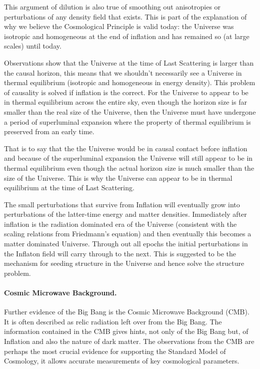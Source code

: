 This argument of dilution is also true of smoothing out anisotropies or perturbations of any density field that exists. This is part of the explanation of why we believe the Cosmological Principle is valid today: the Universe was isotropic and homogeneous at the end of inflation and has remained so (at large scales) until today.

Observations show that the Universe at the time of Last Scattering is larger than the causal horizon, this means that we shouldn't necessarily see a Universe in thermal equilibrium (isotropic and homogeneous in energy density). This problem of causality is solved if inflation is the correct. For the Universe to appear to be in thermal equilibrium across the entire sky, even though the horizon size is far smaller than the real size of the Universe, then the Universe must have undergone a period of superluminal expansion where the property of thermal equilibrium is preserved from an early time.

That is to say that the the Universe would be in causal contact before inflation and because of the superluminal expansion the Universe will still appear to be in thermal equilibrium even though the actual horizon size is much smaller than the size of the Universe. This is why the Universe can appear to be in thermal equilibrium at the time of Last Scattering.

The small perturbations that survive from Inflation will eventually grow into perturbations of the latter-time energy and matter densities. Immediately after inflation is the radiation dominated era of the Universe (consistent with the scaling relations from Friedmann's equation) and then eventually this becomes a matter dominated Universe. Through out all epochs the initial perturbations in the Inflaton field will carry through to the next. This is suggested to be the mechanism for seeding structure in the Universe and hence solve the structure problem. \citep{bib_baum}

\paragraph{Cosmic Microwave Background.}
Further evidence of the Big Bang is the Cosmic Microwave Background (CMB). It is often described as relic radiation left over from the Big Bang. The information contained in the CMB gives hints, not only of the Big Bang but, of Inflation and also the nature of dark matter. The observations from the CMB are perhaps the most crucial evidence for supporting the Standard Model of Cosmology, it allows accurate measurements of key cosmological parameters.

